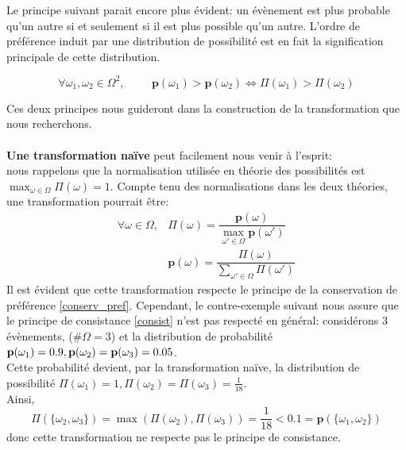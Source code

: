 {Le principe suivant parait encore plus évident: un évènement est plus probable qu'un autre si et seulement si il est plus possible qu'un autre. L'ordre de préférence induit par une distribution de possibilité est en fait la signification principale de cette distribution.
\begin{Def} 
\label{conserv_pref}
\begin{equation*}
\forall \omega_1, \omega_2 \in \Omega^2,   \hspace{1cm}  \mathbf{p}(\omega_1) > \mathbf{p}(\omega_2) \Leftrightarrow \Pi(\omega_1) > \Pi(\omega_2)
\end{equation*}
\end{Def}
Ces deux principes nous guideront dans la construction de la transformation que nous recherchons. \\
\\
\textbf{Une transformation naïve} peut facilement nous venir à l'esprit: \\
nous rappelons que la normalisation utilisée en théorie des possibilités est $\max_{\omega \in \Omega} \Pi(\omega) = 1$. Compte tenu des normalisations dans les deux théories, une transformation pourrait être: \\
\begin{eqnarray*}
\forall \omega \in \Omega, &  \Pi(\omega) = \dfrac{ \mathbf{p}(\omega) }{ \displaystyle \max_{\omega' \in \Omega} \mathbf{p}(\omega')}  \\
& \mathbf{p}(\omega) = \dfrac{\Pi(\omega)}{\displaystyle \sum_{\omega' \in \Omega}\Pi(\omega')}  
\end{eqnarray*}
Il est évident que cette transformation respecte le principe de la conservation de préférence \ref{conserv_pref}. Cependant, le contre-exemple suivant nous assure que le principe de consistance \ref{consist} n'est pas respecté en général: considérons 3 évènements, ($\# \Omega=3$) et la distribution de probabilité $ \mathbf{p}(\omega_1)=0.9, \\  \mathbf{p}(\omega_2)= \mathbf{p}(\omega_3) =0.05$. \\
Cette probabilité devient, par la transformation naïve, la distribution de possibilité $ \Pi(\omega_1)=1, \Pi(\omega_2)=\Pi(\omega_3)=\frac{1}{18} $. \\
Ainsi, \[ \Pi(\{ \omega_2 , \omega_3 \}) = \max(\Pi(\omega_2),\Pi(\omega_3)) = \frac{1}{18} < 0.1 = \mathbf{p}(\{ \omega_1,\omega_2  \})  \]
donc cette transformation ne respecte pas le principe de consistance.
\\

}
